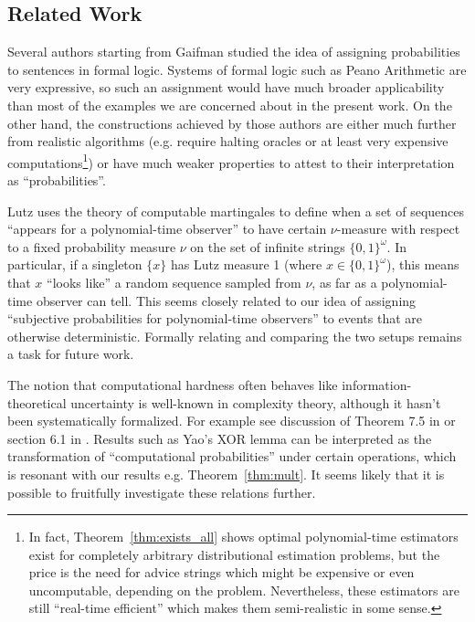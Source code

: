 \documentclass[11pt]{article}
\numberwithin{equation}{section}
\theoremstyle{definition}
\theoremstyle{plain}
\newcommand{\Bool}{\{0,1\}}
\begin{document}
\subsection{Related Work}

Several authors starting from Gaifman studied the idea of assigning probabilities to sentences in formal logic\cite{Gaifman_2004,Hutter_2013,Demski_2012,Christiano_2014,Garrabrant_2015}. Systems of formal logic such as Peano Arithmetic are very expressive, so such an assignment would have much broader applicability than most of the examples we are concerned about in the present work. On the other hand, the constructions achieved by those authors are either much further from realistic algorithms (e.g. require halting oracles or at least very expensive computations\footnote{In fact, Theorem~\ref{thm:exists_all} shows optimal polynomial-time estimators exist for completely arbitrary distributional estimation problems, but the price is the need for advice strings which might be expensive or even uncomputable, depending on the problem. Nevertheless, these estimators are still \enquote{real-time efficient} which makes them semi-realistic in some sense.}) or have much weaker properties to attest to their interpretation as \enquote{probabilities}.

Lutz\cite{Lutz_1998} uses the theory of computable martingales to define when a set of sequences \enquote{appears for a polynomial-time observer} to have certain ${\nu}$-measure with respect to a fixed probability measure ${\nu}$ on the set of infinite strings ${\Bool^\omega}$. In particular, if a singleton ${\{x\}}$ has Lutz measure 1 (where ${x \in \Bool^\omega}$), this means that ${x}$ \enquote{looks like} a random sequence sampled from ${\nu}$, as far as a polynomial-time observer can tell. This seems closely related to our idea of assigning \enquote{subjective probabilities for polynomial-time observers} to events that are otherwise deterministic. Formally relating and comparing the two setups remains a task for future work.

The notion that computational hardness often behaves like information-theoretical uncertainty is well-known in complexity theory, although it hasn't been systematically formalized. For example see discussion of Theorem 7.5 in \cite{Goldreich_2008} or section 6.1 in \cite{Bogdanov_2006}. Results such as Yao's XOR lemma can be interpreted as the transformation of \enquote{computational probabilities} under certain operations, which is resonant with our results e.g. Theorem~\ref{thm:mult}. It seems likely that it is possible to fruitfully investigate these relations further.
\end{document}
